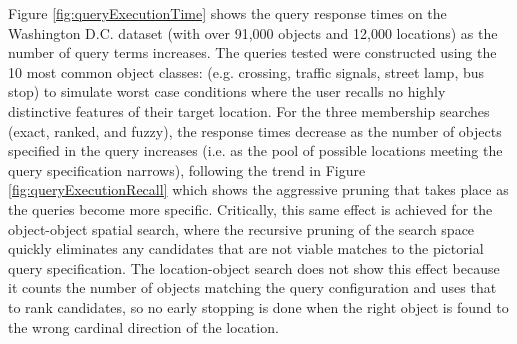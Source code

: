 Figure \ref{fig:queryExecutionTime} shows the query response times on the Washington D.C. dataset (with over 91,000 objects and 12,000 locations) as the number of query terms increases. 
The queries tested were constructed using the 10 most common object classes: (e.g. crossing, traffic signals, street lamp, bus stop) to simulate worst case conditions where the user recalls no highly distinctive features of their target location.
For the three membership searches (exact, ranked, and fuzzy), the response times decrease as the number of objects specified in the query increases (i.e. as the pool of possible locations meeting the query specification narrows), following the trend in Figure \ref{fig:queryExecutionRecall} which shows the aggressive pruning that takes place as the queries become more specific.
Critically, this same effect is achieved for the object-object spatial search, where the recursive pruning of the search space quickly eliminates any candidates that are not viable matches to the pictorial query specification.
The location-object search does not show this effect because it counts the number of objects matching the query configuration and uses that to rank candidates, so no early stopping is done when the right object is found to the wrong cardinal direction of the location. %






